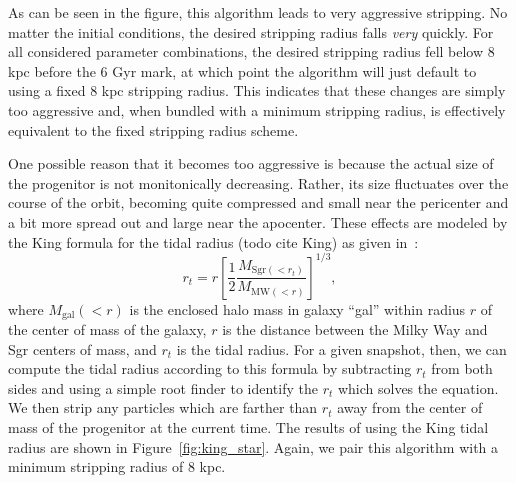 As can be seen in the figure, this algorithm leads to very aggressive stripping.
No matter the initial conditions, the desired stripping radius falls
\textit{very} quickly. For all considered parameter combinations, the desired
stripping radius fell below 8 kpc before the 6 Gyr mark, at which point the
algorithm will just default to using a fixed 8 kpc stripping radius. This
indicates that these changes are simply too aggressive and, when bundled with a
minimum stripping radius, is effectively equivalent to the fixed stripping
radius scheme.

One possible reason that it becomes too aggressive is because the actual
size of the progenitor is not monitonically decreasing.  Rather, its size
fluctuates over the course of the orbit, becoming quite compressed and small
near the pericenter and a bit more spread out and large near the apocenter.
These effects are modeled by the King formula for the tidal radius (todo cite
King) as given in~\cite{dierickx_predicted_2017}:
\begin{equation} \label{eq:king_radius}
    r_t = r \left[ \frac{1}{2} 
    \frac{M_{\text{Sgr}(<r_t)}}{M_{\text{MW}(<r)}} \right]^{1/3},
\end{equation}
where $M_{\text{gal}}(<r)$ is the enclosed halo mass in galaxy ``gal'' within
radius $r$ of the center of mass of the galaxy, $r$ is the distance between
the Milky Way and Sgr centers of mass, and $r_t$ is the tidal radius.  For a
given snapshot, then, we can compute the tidal radius according to this
formula by subtracting $r_t$ from both sides and using a simple root finder to
identify the $r_t$ which solves the equation.  We then strip any particles
which are farther than $r_t$ away from the center of mass of the progenitor at
the current time. The results of using the King tidal radius are shown in
Figure~\ref{fig:king_star}. Again, we pair this algorithm with a minimum
stripping radius of 8 kpc.

